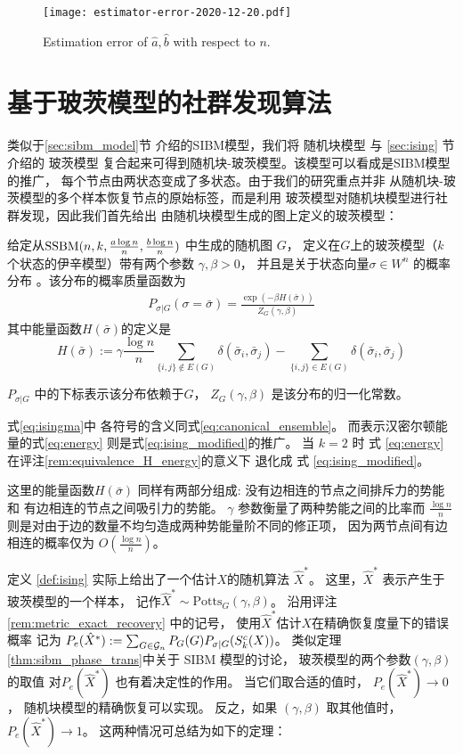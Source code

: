 \begin{figure}[ht!]
	\centering
		\texttt{[image: estimator-error-2020-12-20.pdf]}
		\caption{Estimation error of $\hat{a}, \hat{b}$ with respect to $n$.}\label{fig:estimator}
\end{figure}

\section{基于玻茨模型的社群发现算法}
类似于\ref{sec:sibm_model}节
介绍的SIBM模型，我们将
随机块模型
与 \ref{sec:ising} 节介绍的 玻茨模型
复合起来可得到随机块-玻茨模型。该模型可以看成是SIBM模型的推广，
每个节点由两状态变成了多状态。由于我们的研究重点并非
从随机块-玻茨模型的多个样本恢复节点的原始标签，而是利用
玻茨模型对随机块模型进行社群发现，因此我们首先给出
由随机块模型生成的图上定义的玻茨模型：
\begin{definition}\label{def:ising}
	给定从$\operatorname{SSBM}(n,k,\frac{a \log n}{n},\frac{b \log n}{n})$ 中生成的随机图 $G$，
    定义在$G$上的玻茨模型（$k$个状态的伊辛模型）带有两个参数 $\gamma,\beta>0$，
	并且是关于状态向量$\sigma\in W^n$ 的概率分布
。该分布的概率质量函数为
\begin{align} \label{eq:isingma}
	P_{\sigma|G}(\sigma=\bar{\sigma})=\frac{\exp(-\beta H(\bar{\sigma}))}{Z_G(\gamma,\beta)}
	\end{align}
其中能量函数$H(\bar{\sigma})$的定义是
\begin{equation}\label{eq:energy}
	H(\bar{\sigma}) := \gamma \frac{\log n}{n} \sum_{\{i,j\}\not\in E(G)} \delta(\bar{\sigma}_i, \bar{\sigma}_j)
	- \sum_{\{i,j\}\in E(G)} \delta(\bar{\sigma}_i, \bar{\sigma}_j)
	\end{equation}
	
	$P_{\sigma|G}$ 中的下标表示该分布依赖于$G$，
    $Z_G(\gamma,\beta)$ 是该分布的归一化常数。
\end{definition}

式\eqref{eq:isingma}中
各符号的含义同式\eqref{eq:canonical_ensemble}。
而表示汉密尔顿能量的式\eqref{eq:energy}
则是式\eqref{eq:ising_modified}的推广。
当  $k=2$ 时 式 \eqref{eq:energy}
在评注\ref{rem:equivalence_H_energy}的意义下
退化成 式 \eqref{eq:ising_modified}。 

这里的能量函数$H(\bar{\sigma})$ 同样有两部分组成:
没有边相连的节点之间排斥力的势能和
有边相连的节点之间吸引力的势能。
$\gamma$ 参数衡量了两种势能之间的比率而
$\frac{\log n}{n}$ 则是对由于边的数量不均匀造成两种势能量阶不同的修正项，
因为两节点间有边相连的概率仅为 $O(\frac{\log n}{n})$。

定义 \ref{def:ising} 实际上给出了一个估计$X$的随机算法 $\hat{X}^*$。
这里，$\hat{X}^*$ 表示产生于玻茨模型的一个样本，
记作$\hat{X}^* \sim \textrm{Potts}_G(\gamma, \beta)$。
沿用评注\ref{rem:metric_exact_recovery} 中的记号，
使用$\hat{X}^*$估计$X$在精确恢复度量下的错误概率
记为 $P_e(\hat{X}^*) := \sum_{G \in \mathcal{G}_n} P_G(G) P_{\sigma | G}(S^c_k(X))$。
类似定理\ref{thm:sibm_phase_trans}中关于 SIBM 模型的讨论，
玻茨模型的两个参数$(\gamma, \beta)$ 的取值
对$P_e(\hat{X}^*)$
也有着决定性的作用。
当它们取合适的值时， 
$ P_e(\hat{X}^*)\to 0$，
随机块模型的精确恢复可以实现。
反之，如果 $(\gamma, \beta)$ 取其他值时，
$P_e(\hat{X}^*) \to 1$。
这两种情况可总结为如下的定理：

